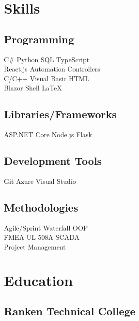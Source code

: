 \documentclass[]{TTurner}
\begin{document}
\hfill
\begin{minipage}[t]{0.25\textwidth} 


\section{Skills}
\subsection{Programming}
\sectionsep
{}
C\# \textbullet{} Python \textbullet{} SQL \textbullet{} TypeScript \\
React.js \textbullet{} Automation Controllers\\
\sectionsep
{}
C/C++ \textbullet{} Visual Basic \textbullet{} HTML\\
Blazor \textbullet{} Shell \textbullet{} \LaTeX\\
\sectionsep
\sectionsep
\subsection{Libraries/Frameworks}
\sectionsep
ASP.NET Core \textbullet{} Node.js \textbullet{} Flask\\
\sectionsep
\sectionsep
\subsection{Development Tools}
\sectionsep
Git \textbullet{} Azure \textbullet{} Visual Studio \\
\sectionsep
\subsection{Methodologies}
\sectionsep
Agile/Sprint \textbullet{} Waterfall \textbullet{} OOP\\
FMEA \textbullet{} UL 508A \textbullet{} SCADA \textbullet{}\\ 
Project Management\\
\sectionsep


\section{Education} 
\subsection{Ranken Technical College}


\end{minipage}
\end{document}
